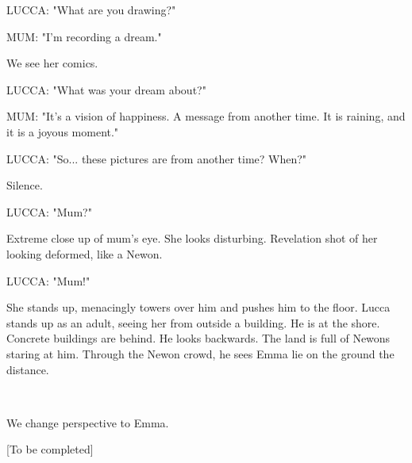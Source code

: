 \documentclass[11pt]{article}
\begin{document}
LUCCA: "What are you drawing?"

MUM: "I'm recording a dream."

We see her comics.

LUCCA: "What was your dream about?"

MUM: "It's a vision of happiness. 
A message from another time.
It is raining, and it is a joyous moment."

LUCCA: "So... these pictures are from another time?
When?"

Silence.

LUCCA: "Mum?"

Extreme close up of mum's eye.
She looks disturbing.
Revelation shot of her looking deformed, like a Newon.

LUCCA: "Mum!"

She stands up, menacingly towers over him and pushes him to the floor.
Lucca stands up as an adult, seeing her from outside a building.
He is at the shore. 
Concrete buildings are behind.
He looks backwards.
The land is full of Newons staring at him.
Through the Newon crowd, he sees Emma lie on the ground the distance. 

\ 

We change perspective to Emma. 






[To be completed]
\end{document}
